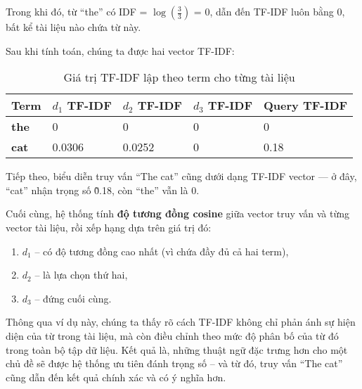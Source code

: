 Trong khi đó, từ ``the'' có IDF = \(\log(\frac{3}{3})\) = 0, dẫn đến TF-IDF luôn bằng 0, bất kể tài liệu nào chứa từ này.

Sau khi tính toán, chúng ta được hai vector TF-IDF:

\begin{table}[H]
    \caption{Giá trị TF-IDF lập theo term cho từng tài liệu}
    \begin{tabularx}{\linewidth}{l || X X X l}
        \toprule
        \textbf{Term} & \textbf{\(d_1\) TF-IDF} & \textbf{\(d_2\) TF-IDF} & \textbf{\(d_3\) TF-IDF} & \textbf{Query TF-IDF} \\
        \midrule\midrule
        \textbf{the}  & 0                       & 0                       & 0                       & 0                     \\
        \textbf{cat}  & 0.0306                  & 0.0252                  & 0                       & 0.18                  \\
        \bottomrule
    \end{tabularx}
\end{table}

Tiếp theo, biểu diễn truy vấn ``The cat'' cũng dưới dạng TF-IDF vector — ở đây, ``cat'' nhận trọng số \~0.18, còn ``the'' vẫn là 0.

Cuối cùng, hệ thống tính \textbf{độ tương đồng cosine} giữa vector truy vấn và từng vector tài liệu, rồi xếp hạng dựa trên giá trị đó:

\begin{enumerate}
    \item \(d_{1}\) -- có độ tương đồng cao nhất (vì chứa đầy đủ cả hai term),
    \item \(d_{2}\) -- là lựa chọn thứ hai,
    \item \(d_{3}\) -- đứng cuối cùng.
\end{enumerate}

Thông qua ví dụ này, chúng ta thấy rõ cách TF-IDF không chỉ phản ánh sự hiện diện của từ trong tài liệu, mà còn điều chỉnh theo mức độ phân bố của từ đó trong toàn bộ tập dữ liệu. Kết quả là, những thuật ngữ đặc trưng hơn cho một chủ đề sẽ được hệ thống ưu tiên đánh trọng số -- và từ đó, truy vấn ``The cat'' cũng dẫn đến kết quả chính xác và có ý nghĩa hơn.
